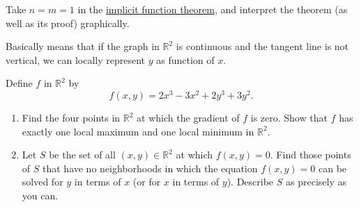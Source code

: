 	\begin{exercise}[Rudin 9.20]
		Take $n=m=1$ in the \hyperref[thm:implicit-function-theorem]{implicit function theorem}, and interpret the theorem (as well as its proof) graphically.
	\end{exercise}
	\begin{solution}
	  Basically means that if the graph in $\mathbb{R}^2$ is continuous and the tangent line is not vertical, we can locally represent $y$ as function of $x$. 
	\end{solution}

	\begin{exercise}[Rudin 9.21]
		Define $f$ in $\mathbb{R}^2$ by
		\begin{equation}
			f(x,y)=2x^3-3x^2+2y^3+3y^2.
		\end{equation}

		\begin{enumerate}[label=(\alph*)]
			\item Find the four points in $\mathbb{R}^2$ at which the gradient of $f$ is zero. Show that $f$ has exactly one local maximum and one local minimum in $\mathbb{R}^2$.

			\item Let $S$ be the set of all $(x,y)\in\mathbb{R}^2$ at which $f(x,y)=0$. Find those points of $S$ that have no neighborhoods in which the equation $f(x,y)=0$ can be solved for $y$ in terms of $x$ (or for $x$ in terms of $y$). Describe $S$ as precisely as you can.
		\end{enumerate}
	\end{exercise}
